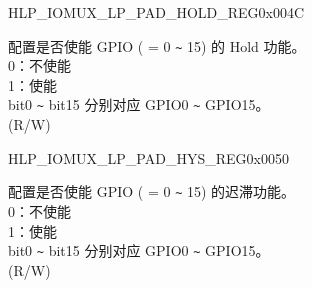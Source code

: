 \begin{register}{H}{LP\_IOMUX\_LP\_PAD\_HOLD\_REG}{0x004C}\label{regdesc:LPIOMUXLPPADHOLDREG}
%
%
\regnewline%
\begin{regdesc}\begin{reglist}
\label{fielddesc:LPIOMUXLPGPIOHOLD}\item [LP\_IOMUX\_LP\_GPIO\_HOLD] 配置是否使能 GPIO ( = 0 \verb+~+ 15) 的 Hold 功能。\\
0：不使能\\
1：使能\\
bit0 \verb+~+ bit15 分别对应 GPIO0 \verb+~+ GPIO15。\\
(R/W)
\end{reglist}\end{regdesc}
\end{register}


\begin{register}{H}{LP\_IOMUX\_LP\_PAD\_HYS\_REG}{0x0050}\label{regdesc:LPIOMUXLPPADHYSREG}
%
%
\regnewline%
\begin{regdesc}\begin{reglist}
\label{fielddesc:LPIOMUXLPGPIOHYS}\item [LP\_IOMUX\_LP\_GPIO\_HYS] 配置是否使能 GPIO ( = 0 \verb+~+ 15) 的迟滞功能。\\
0：不使能\\
1：使能\\
bit0 \verb+~+ bit15 分别对应 GPIO0 \verb+~+ GPIO15。\\
(R/W)
\end{reglist}\end{regdesc}
\end{register}


